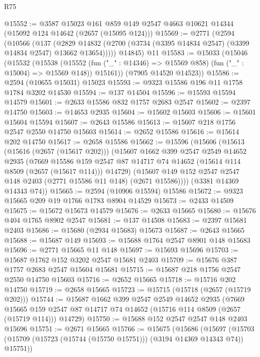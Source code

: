 \begin{lexlean}{R75}
\begin{coremodule}
@15552 := @3587
    @15023
    @161
    @859
    @149
    @2547
    @4663
    @10621
    @14344
    (@15092 @124 @14642 (@2657 (@15095 @124)))
@15569 := @2771
    (@2594
      (@10566
        (@137
          (@2829 @14832 (@2700 (@3734 (@3395 @14834 @2547) (@3399 @14834 @2547) @13662 @13654)))))
      @14845)
    @11
@15583 := @15033
    (@15046
      (@15532
        (@15538
          (@15552 (fun ("_" : @14346) => @15569 @858) (fun ("_" : @15004) => @15569 @148))
          @15161))
      (@7905 @14520 @14523))
@15586 := @2594 (@10655 @15031) @15023
@15593 := @9323 @15586 @196 @11 @1758 @1784 @3202 @14530
@15594 := @137 @14504
@15596 := @15593 @15594 @14579
@15601 := @2633 @15586 @832 @1757 @2683 @2547
@15602 := @2397 @14750
@15603 := @14653 @2935
@15604 := @15602 @15603
@15606 := @15601 @15604 @15594
@15607 := @2643 @15586
@15613 := @15607 @218 @1756 @2547 @2550 @14750 @15603
@15614 := @2652 @15586
@15616 := @15614 @202 @14750
@15617 := @2658 @15586
@15662 := @15596
    (@15606
      (@15613
        (@15616 (@2657 (@15617 @202)))
        (@15607
          @1662
          @399
          @2547
          @2549
          @14652
          @2935
          (@7669
            @15586
            @159
            @2547
            @87
            @14717
            @74
            @14652
            (@15614 @114 @8509 (@2657 (@15617 @114)))
            @14729)
          (@15607 @149 @152 @2547 @2547 @148 @2403 (@2771 @15586 @11 @148) (@2671 @15586))))
      (@3381 @14369 @14343 @74))
@15665 := @2594 (@10906 @15594) @15586
@15672 := @9323 @15665 @209 @19 @1766 @1783 @8904 @14529
@15673 := @2433 @14509
@15675 := @15672 @15673 @14579
@15676 := @2633 @15665
@15680 := @15676 @404 @1765 @8902 @2547
@15681 := @137 @14508
@15683 := @2397 @15681 @2403
@15686 := @15680 (@2934 @15683) @15673
@15687 := @2643 @15665
@15688 := @15687 @149
@15693 := @15688 @1764 @2547 @8901 @148 @15683
@15696 := @2771 @15665 @11 @148
@15697 := @15693 @15696
@15703 := @15687 @1762 @152 @3202 @2547 @15681 @2403
@15709 := @15676 @387 @1757 @2683 @2547 @15604 @15681
@15715 := @15687 @218 @1756 @2547 @2550 @14750 @15603
@15716 := @2652 @15665
@15718 := @15716 @202 @14750
@15719 := @2658 @15665
@15723 := @15715 (@15718 (@2657 (@15719 @202)))
@15744 := @15687
    @1662
    @399
    @2547
    @2549
    @14652
    @2935
    (@7669 @15665 @159 @2547 @87 @14717 @74 @14652 (@15716 @114 @8509 (@2657 (@15719 @114))) @14729)
@15750 := @15688 @152 @2547 @2547 @148 @2403 @15696
@15751 := @2671 @15665
@15766 := @15675
    (@15686
      (@15697 (@15703 (@15709 (@15723 (@15744 (@15750 @15751))) (@3194 @14369 @14343 @74)) @15751))

\end{coremodule}
\end{lexlean}
